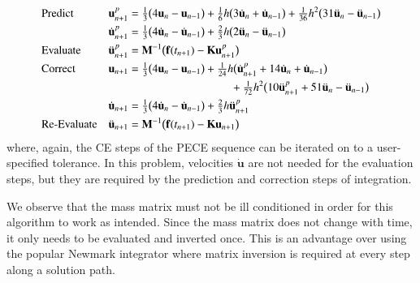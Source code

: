 \begin{subequations}
    \notag
    \begin{align}
    \mbox{} & \text{Predict} &
    \mathbf{u}_{n+1}^p & = \tfrac{1}{3} \bigl(
    4 \mathbf{u}_n - \mathbf{u}_{n-1} \bigr) + 
    \tfrac{1}{6} h \bigl( 3 \dot{\mathbf{u}}_n + 
    \dot{\mathbf{u}}_{n-1} \bigr) + 
    \tfrac{1}{36} h^2 \bigl( 31 \ddot{\mathbf{u}}_n - 
    \ddot{\mathbf{u}}_{n-1} \bigr) \\
    \mbox{} & &
    \dot{\mathbf{u}}_{n+1}^p & = \tfrac{1}{3} 
    \bigl( 4 \dot{\mathbf{u}}_n - \dot{\mathbf{u}}_{n-1} \bigr) + 
    \tfrac{2}{3} h \bigl( 2 \ddot{\mathbf{u}}_n - \ddot{\mathbf{u}}_{n-1} \bigr) \\
    \mbox{} & \text{Evaluate} &
    \ddot{\mathbf{u}}^p_{n+1} & = \mathbf{M}^{-1} \bigl( \mathbf{f}(t_{n+1} ) - 
    \mathbf{K} \mathbf{u}_{n+1}^p \bigr) \\
    \mbox{} & \text{Correct} & 
    \mathbf{u}_{n+1} & = \tfrac{1}{3} \bigl(
    4  \mathbf{u}_n - \mathbf{u}_{n-1} \bigr) +
    \tfrac{1}{24} h \bigl( \dot{\mathbf{u}}^p_{n+1} +
    14 \dot{\mathbf{u}}_n + \dot{\mathbf{u}}_{n-1} \bigr)  \\
    \mbox{} & & & \hspace{3.175cm} +
    \tfrac{1}{72} h^2 \bigl( 10 \ddot{\mathbf{u}}^p_{n+1} + 
    51 \ddot{\mathbf{u}}_n - \ddot{\mathbf{u}}_{n-1} \bigr) \\ 
    \mbox{} & &
    \dot{\mathbf{u}}_{n+1} & = \tfrac{1}{3} 
    \bigl( 4 \dot{\mathbf{u}}_n - \dot{\mathbf{u}}_{n-1} \bigr) + 
    \tfrac{2}{3} h \ddot{\mathbf{u}}^p_{n+1}  \\
    \mbox{} & \text{Re-Evaluate} & 
    \ddot{\mathbf{u}}_{n+1} & = \mathbf{M}^{-1} \bigl( \mathbf{f}(t_{n+1} ) - 
    \mathbf{K} \mathbf{u}_{n+1} \bigr) 
    \end{align}
\end{subequations}
where, again, the CE steps of the PECE sequence can be iterated on to a user-specified tolerance.  In this problem, velocities $\dot{\mathbf{u}}$ are not needed for the evaluation steps, but they are required by the prediction and correction steps of integration.

We observe that the mass matrix must not be ill conditioned in order for this algorithm to work as intended.  Since the mass matrix does not change with time, it only needs to be evaluated and inverted once.  This is an advantage over using the popular Newmark \cite{Newmark59} integrator where matrix inversion is required at every step along a solution path.

